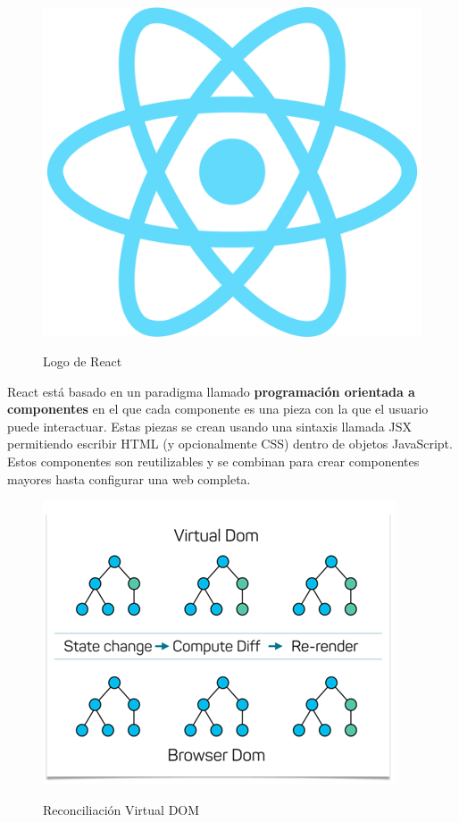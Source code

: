 \documentclass[12pt,twoside,titlepage]{report}
\begin{document}
\begin{figure}[H]
    \centering
    \includegraphics[scale=0.07]{React/React}
    \label{fig:ReactLogo}
    \caption{Logo de React}
\end{figure}

React está basado en un paradigma llamado \textbf{programación orientada a componentes} en el que cada componente es una pieza con la que el usuario puede interactuar. Estas piezas se crean usando una sintaxis llamada JSX permitiendo escribir HTML (y opcionalmente CSS) dentro de objetos JavaScript. Estos componentes son reutilizables y se combinan para crear componentes mayores hasta configurar una web completa.


\begin{figure}[H]
    \centering
    \includegraphics[scale=0.5]{React/VirtualDOM1}
    \label{fig:React_VirtualDom}
    \caption{Reconciliación Virtual DOM}
\end{figure}
\end{document}
